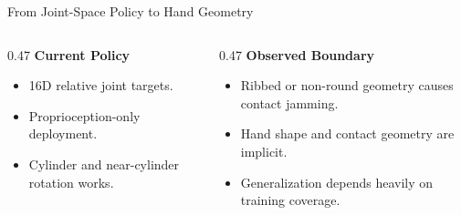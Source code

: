 \documentclass{beamer}
\begin{document}
\begin{frame}{From Joint-Space Policy to Hand Geometry}
    \small
    \vspace{0.65em}
    \begin{columns}[T,onlytextwidth]
        \begin{column}{0.47\textwidth}
            \textbf{\textcolor{maincolor}{Current Policy}}
            \begin{itemize}
                \item 16D relative joint targets.
                \item Proprioception-only deployment.
                \item Cylinder and near-cylinder rotation works.
            \end{itemize}
        \end{column}
        \begin{column}{0.47\textwidth}
            \textbf{\textcolor{maincolor}{Observed Boundary}}
            \begin{itemize}
                \item Ribbed or non-round geometry causes contact jamming.
                \item Hand shape and contact geometry are implicit.
                \item Generalization depends heavily on training coverage.
            \end{itemize}
        \end{column}
    \end{columns}

    \vspace{0.85em}
    \centering
\end{frame}
\end{document}

